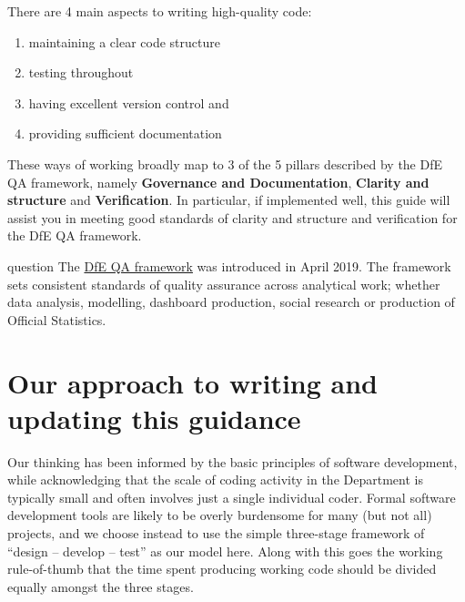 \documentclass[
]{book}
\providecommand{\tightlist}{%
  \setlength{\itemsep}{0pt}\setlength{\parskip}{0pt}}
\begin{document}
There are 4 main aspects to writing high-quality code:

\begin{enumerate}
\def\labelenumi{\arabic{enumi}.}
\tightlist
\item
  maintaining a clear code structure
\item
  testing throughout
\item
  having excellent version control and
\item
  providing sufficient documentation
\end{enumerate}

These ways of working broadly map to 3 of the 5 pillars described by the DfE QA framework, namely \textbf{Governance and Documentation}, \textbf{Clarity and structure} and \textbf{Verification}. In particular, if implemented well, this guide will assist you in meeting good standards of clarity and structure and verification for the DfE QA framework.

\begin{infoboxyellow}question
The \href{https://assets.publishing.service.gov.uk/government/uploads/system/uploads/attachment_data/file/878616/Principles_of_QA_for_analysis.pdf}{DfE QA framework} was introduced in April 2019.
The framework sets consistent standards of quality assurance across analytical work; whether data analysis, modelling, dashboard production, social research or production of Official Statistics.

\end{infoboxyellow}

\hypertarget{our-approach-to-writing-and-updating-this-guidance}{%
\section{Our approach to writing and updating this guidance}\label{our-approach-to-writing-and-updating-this-guidance}}

Our thinking has been informed by the basic principles of software development, while acknowledging that the scale of coding activity in the Department is typically small and often involves just a single individual coder. Formal software development tools are likely to be overly burdensome for many (but not all) projects, and we choose instead to use the simple three-stage framework of ``design -- develop -- test'' as our model here. Along with this goes the working rule-of-thumb that the time spent producing working code should be divided equally amongst the three stages.
\end{document}

